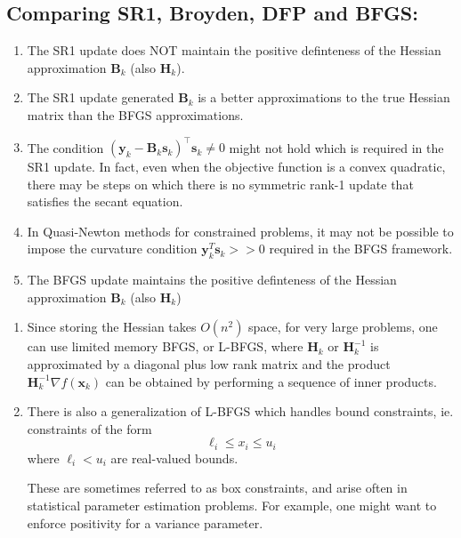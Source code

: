 \documentclass[11pt]{article}
\theoremstyle{plain} %
\newenvironment{topic}
{\color{C2}\normalfont\begin{framed}\begingroup }
  {\endgroup\end{framed}}
\theoremstyle{remark}
\newenvironment{remark}
  {\pushQED{\qed}\renewcommand{\qedsymbol}{$\triangle$}\remarkx}
  {\popQED\endremarkx}
\begin{document}
\subsection{Comparing SR1, Broyden, DFP and BFGS:}
\begin{topic}
  \begin{enumerate}
    \item The SR1 update does NOT maintain the positive definteness of the Hessian approximation $\mathbf{B}_k$ (also $\mathbf{H}_k$).
    \item The SR1 update generated $\mathbf{B}_k$ is a better approximations to the
          true Hessian matrix than the BFGS approximations.
    \item The condition $\left(\mathbf{y}_k-\mathbf{B}_k \mathbf{s}_k\right)^{\top} \mathbf{s}_k \neq 0$ might not hold which is required in
          the SR1 update. In fact, even when the objective function is a convex quadratic,
          there may be steps on which there is no symmetric rank-1 update that satisfies
          the secant equation.
    \item In Quasi-Newton methods for constrained problems, it may not be possible to impose
          the curvature condition $\mathbf{y}_k^T \mathbf{s}_k> >0$ required in the BFGS framework.
    \item The BFGS update maintains the positive definteness of the Hessian approximation $\mathbf{B}_k$ (also $\mathbf{H}_k$)
  \end{enumerate}

  \begin{remark}\hfill
    \begin{enumerate}
      \item Since storing the Hessian takes $O\left(n^{2}\right)$ space, for very large
            problems, one can use limited memory BFGS, or L-BFGS, where
            $\mathbf{H}_{k}$ or $\mathbf{H}_{k}^{-1}$ is approximated by a
            diagonal plus low rank matrix and the product $\mathbf{H}_{k}^{-1}
              \nabla f(\mathbf{x}_k)$ can be obtained by performing a sequence of inner products.
      \item There is also a generalization of L-BFGS which handles bound constraints, ie. constraints of the form
            \[
              \ell_{i} \leq x_{i} \leq u_{i}
            \]
            where $\ell_{i}<u_{i}$ are real-valued bounds.

            These are sometimes referred to as box constraints, and arise often in
            statistical parameter estimation problems. For example, one might want to
            enforce positivity for a variance parameter.
    \end{enumerate}
  \end{remark}

\end{topic}
\end{document}
